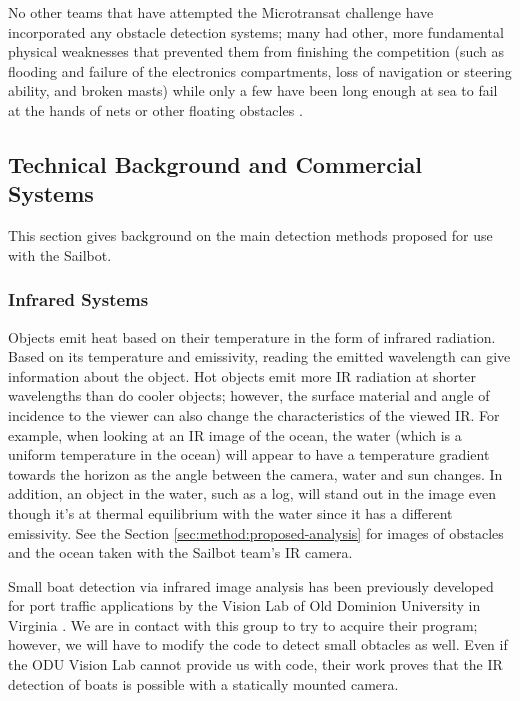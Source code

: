 No other teams that have attempted the Microtransat challenge have incorporated any obstacle detection systems; many had other, more fundamental physical weaknesses that prevented them from finishing the competition (such as flooding and failure of the electronics compartments, loss of navigation or steering ability, and broken masts) while only a few have been long enough at sea to fail at the hands of nets or other floating obstacles \cite{transat-history}.


\subsection{\label{sec:intro:technical-background}Technical Background and Commercial Systems}
This section gives background on the main detection methods proposed for use with the Sailbot.


\subsubsection{\label{sec:intro:technical-background:ir}Infrared Systems}
Objects emit heat based on their temperature in the form of infrared radiation. Based on its temperature and emissivity, reading the emitted wavelength can give information about the object. Hot objects emit more IR radiation at shorter wavelengths than do cooler objects; however, the surface material and angle of incidence to the viewer can also change the characteristics of the viewed IR. For example, when looking at an IR image of the ocean, the water (which is a uniform temperature in the ocean) will appear to have a temperature gradient towards the horizon as the angle between the camera, water and sun changes. In addition, an object in the water, such as a log, will stand out in the image even though it's at thermal equilibrium with the water since it has a different emissivity. See the Section \ref{sec:method:proposed-analysis} for images of obstacles and the ocean taken with the Sailbot team's IR camera.

Small boat detection via infrared image analysis has been previously developed for port traffic applications by the Vision Lab of Old Dominion University in Virginia \cite{ODU-boat-IR-detection}. We are in contact with this group to try to acquire their program; however, we will have to modify the code to detect small obtacles as well. Even if the ODU Vision Lab cannot provide us with code, their work proves that the IR detection of boats is possible with a statically mounted camera.

